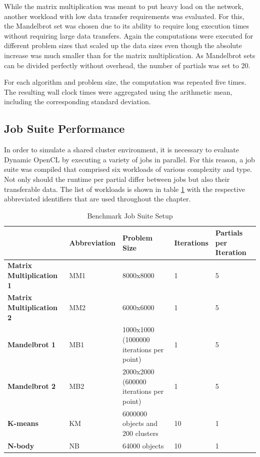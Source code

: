 While the matrix multiplication was meant to put heavy load on the network, another workload with low data transfer requirements was evaluated. For this, the Mandelbrot set was chosen due to its ability to require long execution times without requiring large data transfers. Again the computations were executed for different problem sizes that scaled up the data sizes even though the absolute increase was much smaller than for the matrix multiplication. As Mandelbrot sets can be divided perfectly without overhead, the number of partials was set to 20.

For each algorithm and problem size, the computation was repeated five times. The resulting wall clock times were aggregated using the arithmetic mean, including the corresponding standard deviation.

\subsection{Job Suite Performance}

In order to simulate a shared cluster environment, it is necessary to evaluate Dynamic OpenCL by executing a variety of jobs in parallel. For this reason, a job suite was compiled that comprised six workloads of various complexity and type. Not only should the runtime per partial differ between jobs but also their transferable data. The list of workloads is shown in table \ref{table:benchmark_job_setup} with the respective abbreviated identifiers that are used throughout the chapter.

\begin{table}[!htb]
	\centering
	\begin{adjustbox}{width=0.95\textwidth}
		\small
		\begin{tabular}{l | l | l | l | l}
			~ & \textbf{Abbreviation}						& \textbf{Problem Size}		& \textbf{Iterations}	& \textbf{Partials per Iteration} \\
			\hline
			\textbf{Matrix Multiplication 1}	& MM1  	& 8000x8000  								& 1 	& 5 \\
			\textbf{Matrix Multiplication 2} 	& MM2	& 6000x6000  								& 1		& 5 \\
			\textbf{Mandelbrot 1}     		 	& MB1	& 1000x1000 (1000000 iterations per point) 	& 1		& 5 \\
			\textbf{Mandelbrot 2}				& MB2	& 2000x2000 (600000 iterations per point)  	& 1		& 5 \\
			\textbf{K-means}          			& KM 	& 6000000 objects and 200 clusters  		& 10	& 1 \\
			\textbf{N-body}    		 			& NB 	& 64000 objects  							& 10	& 1 \\
		\end{tabular}
	\end{adjustbox}

	\caption{Benchmark Job Suite Setup}
	\label{table:benchmark_job_setup}
\end{table}

